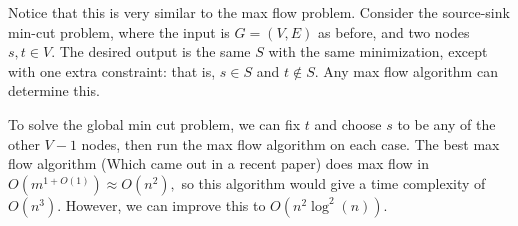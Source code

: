 \documentclass{article}
\numberwithin{equation}{section}
\begin{document}
Notice that this is very similar to the max flow problem. Consider the source-sink min-cut problem, where the input is $G=(V,E)$ as before, and two nodes $s,t\in V.$ The desired output is the same $S$ with the same minimization, except with one extra constraint: that is, $s\in S$ and $t\notin S.$ Any max flow algorithm can determine this.

To solve the global min cut problem, we can fix $t$ and choose $s$ to be any of the other $V-1$ nodes, then run the max flow algorithm on each case. The best max flow algorithm (Which came out in a recent paper) does max flow in $O(m^{1+O(1)}) \approx O(n^2),$ so this algorithm would give a time complexity of $O(n^3).$ However, we can improve this to $O(n^2\log^2(n)).$
\end{document}
